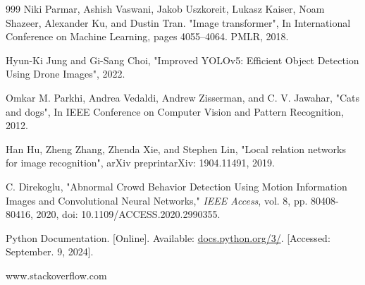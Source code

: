 \documentclass[11pt]{report}
\begin{document}
\begin{thebibliography}{999}
    Niki Parmar, Ashish Vaswani, Jakob Uszkoreit, Lukasz Kaiser, Noam Shazeer, Alexander Ku, and Dustin Tran. "Image transformer", In International Conference on Machine Learning, pages 4055–4064. PMLR, 2018.

    Hyun-Ki Jung and Gi-Sang Choi, "Improved YOLOv5: Efficient Object Detection Using Drone Images", 2022.
    
    Omkar M. Parkhi, Andrea Vedaldi, Andrew Zisserman, and C. V. Jawahar, "Cats and dogs", In IEEE Conference on Computer Vision and Pattern Recognition, 2012.

    Han Hu, Zheng Zhang, Zhenda Xie, and Stephen Lin, "Local relation networks for image recognition", arXiv preprintarXiv: 1904.11491, 2019. 

    C. Direkoglu, "Abnormal Crowd Behavior Detection Using Motion Information Images and Convolutional Neural Networks," \textit{IEEE Access}, vol. 8, pp. 80408-80416, 2020, doi: 10.1109/ACCESS.2020.2990355.

    Python Documentation. [Online]. Available: \url{docs.python.org/3/}. [Accessed: September. 9, 2024].
    
     www.stackoverflow.com

\end{thebibliography}
\end{document}
